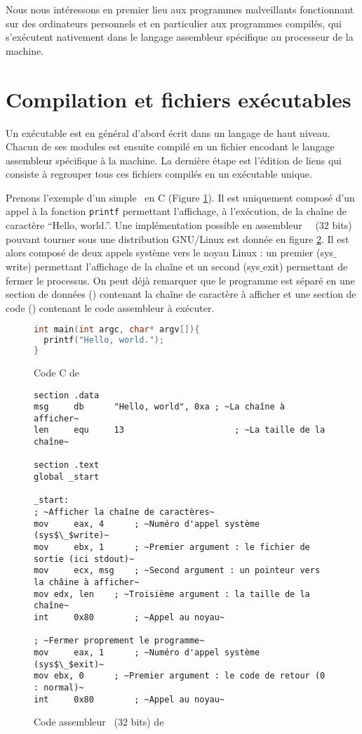 Nous nous intéressons en premier lieu aux programmes malveillants fonctionnant sur des ordinateurs personnels et en particulier aux programmes compilés, qui s'exécutent nativement dans le langage assembleur spécifique au processeur de la machine.


\section{Compilation et fichiers exécutables}
Un exécutable est en général d'abord écrit dans un langage de haut niveau. Chacun de ses modules est ensuite compilé en un fichier  encodant le langage assembleur spécifique à la machine. La dernière étape est l'édition de liens qui consiste à regrouper tous ces fichiers compilés en un exécutable unique.

Prenons l'exemple d'un simple \helloworld\ en C (Figure \ref{fig:helloword_c}). Il est uniquement composé d'un appel à la fonction \texttt{printf} permettant l'affichage, à l'exécution, de la chaîne de caractère ``Hello, world.''.
Une implémentation possible en assembleur \nasm\ \xq\ (32 bits) pouvant tourner sous une distribution GNU/Linux est donnée en figure \ref{fig:helloword_asm}. Il est alors composé de deux appels système vers le noyau Linux : un premier (sys$\_$write) permettant l'affichage de la chaîne et un second (sys$\_$exit) permettant de fermer le processus.
On peut déjà remarquer que le programme est séparé en une section de données (\pdata) contenant la chaîne de caractère à afficher et une section de code (\ptext) contenant le code assembleur à exécuter.
\begin{figure}
\begin{lstlisting}[language={C}]
int main(int argc, char* argv[]){
  printf("Hello, world.");
}
\end{lstlisting}
\caption{Code C de \helloworld}
\label{fig:helloword_c}
\end{figure}


\begin{figure}
\begin{lstlisting}[language={[x86masm]Assembler}, escapechar=~]
section .data
msg     db      "Hello, world", 0xa	; ~La chaîne à afficher~
len     equ     13                      ; ~La taille de la chaîne~

section .text
global _start

_start:
; ~Afficher la chaîne de caractères~
mov     eax, 4      ; ~Numéro d'appel système (sys$\_$write)~
mov     ebx, 1      ; ~Premier argument : le fichier de sortie (ici stdout)~
mov     ecx, msg    ; ~Second argument : un pointeur vers la châine à afficher~
mov	edx, len    ; ~Troisième argument : la taille de la chaîne~
int     0x80        ; ~Appel au noyau~

; ~Fermer proprement le programme~
mov     eax, 1      ; ~Numéro d'appel système (sys$\_$exit)~
mov	ebx, 0	    ; ~Premier argument : le code de retour (0 : normal)~
int     0x80	    ; ~Appel au noyau~
\end{lstlisting}
\caption{Code assembleur \xq\ (32 bits) de \helloworld}
\label{fig:helloword_asm}
\end{figure}

